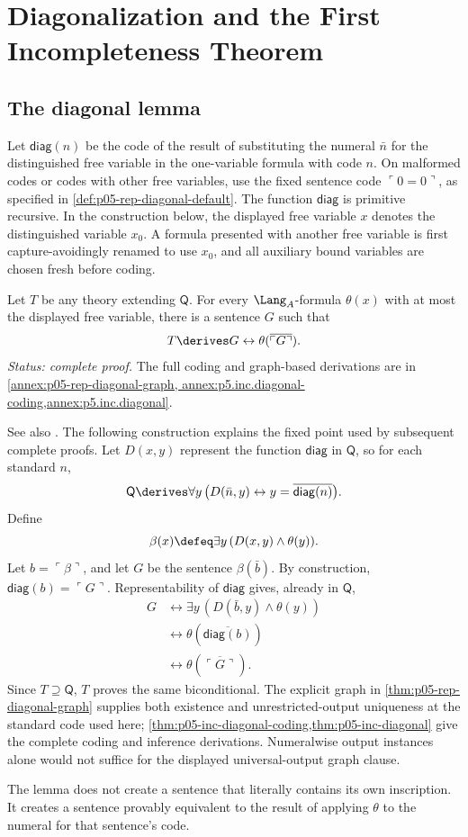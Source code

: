 \chapter{Diagonalization and the First Incompleteness Theorem}
\label{ch:first-incompleteness}

\section{The diagonal lemma}
\label{sec:first-incompleteness-01}

Let \(\mathsf{diag}(n)\) be the code of the result of substituting the numeral
\(\bar n\) for the distinguished free variable in the one-variable formula
with code \(n\).  On malformed codes or codes with other free variables,
use the fixed sentence code \(\ulcorner0=0\urcorner\), as specified in
\cref{def:p05-rep-diagonal-default}.  The
function \(\mathsf{diag}\) is primitive recursive.
In the construction below, the displayed free variable \(x\) denotes
the distinguished variable \(x_0\).  A formula presented with another
free variable is first capture-avoidingly renamed to use \(x_0\), and
all auxiliary bound variables are chosen fresh before coding.

\begin{theorem}
\label{thm:diagonal-lemma}
Let \(T\) be any theory extending \(\mathsf Q\).  For every
\(\Lang_A\)-formula \(\theta(x)\) with at most the displayed free variable,
there is a sentence \(G\) such that
\[
  T\derives G\leftrightarrow
  \theta(\overline{\ulcorner G\urcorner}).
\]
\textit{Status: complete proof.}  The full coding and graph-based
derivations are in \cref{annex:p05-rep-diagonal-graph,
annex:p5.inc.diagonal-coding,annex:p5.inc.diagonal}.
\end{theorem}

See also \cite{BoolosBurgessJeffrey2007}.  The following
construction explains the fixed point used by subsequent complete proofs.
Let \(D(x,y)\) represent the function \(\mathsf{diag}\) in \(\mathsf Q\), so
for each standard \(n\),
\[
  \mathsf Q\derives\forall y\,
  \bigl(D(\bar n,y)\leftrightarrow
  y=\overline{\mathsf{diag}(n)}\bigr).
\]
Define
\[
  \beta(x)\defeq\exists y\,(D(x,y)\land\theta(y)).
\]
Let \(b=\ulcorner\beta\urcorner\), and let
\(G\) be the sentence \(\beta(\bar b)\).  By construction,
\(\mathsf{diag}(b)=\ulcorner G\urcorner\).  Representability of
\(\mathsf{diag}\) gives, already in \(\mathsf Q\),
\[
\begin{aligned}
  G
  &\leftrightarrow \exists y\,(D(\bar b,y)\land\theta(y))\\
  &\leftrightarrow
  \theta(\overline{\mathsf{diag}(b)})\\
  &\leftrightarrow\theta(\overline{\ulcorner G\urcorner}).
\end{aligned}
\]
Since \(T\supseteq\mathsf Q\), \(T\) proves the same biconditional.
The explicit graph in \cref{thm:p05-rep-diagonal-graph} supplies both
existence and unrestricted-output uniqueness at the standard code used
here; \cref{thm:p05-inc-diagonal-coding,thm:p05-inc-diagonal} give the
complete coding and inference derivations.  Numeralwise output instances
alone would not suffice for the displayed universal-output graph clause.

\begin{remark}
The lemma does not create a sentence that literally contains its own
inscription.  It creates a sentence provably equivalent to the result of
applying \(\theta\) to the numeral for that sentence's code.
\end{remark}
